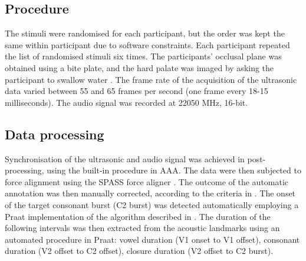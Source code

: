 \documentclass[authoryear]{elsarticle}
\begin{document}
\subsection{Procedure}\label{procedure}

The stimuli were randomised for each participant, but the order was kept
the same within participant due to software constraints. Each
participant repeated the list of randomised stimuli six times. The
participants' occlusal plane was obtained using a bite plate, and the
hard palate was imaged by asking the participant to swallow water
\citep{scobbie2011}. The frame rate of the acquisition of the ultrasonic
data varied between 55 and 65 frames per second (one frame every 18-15
milliseconds). The audio signal was recorded at 22050 MHz, 16-bit.

\subsection{Data processing}\label{data-processing}

Synchronisation of the ultrasonic and audio signal was achieved in
post-processing, using the built-in procedure in AAA. The data were then
subjected to force alignment using the SPASS force aligner
\citep{bigi2015}. The outcome of the automatic annotation was then
manually corrected, according to the criteria in .
The onset of the target consonant burst (C2 burst) was detected
automatically employing a Praat implementation of the algorithm
described in \citet{ananthapadmanabha2014}. The duration of the
following intervals was then extracted from the acoustic landmarks using
an automated procedure in Praat: vowel duration (V1 onset to V1 offset),
consonant duration (V2 offset to C2 offset), closure duration (V2 offset
to C2 burst).

\end{document}
